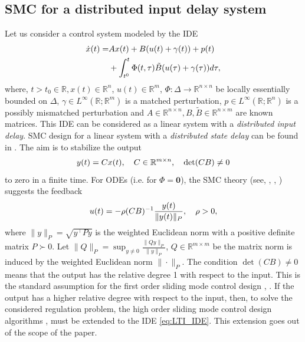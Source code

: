 \documentclass{article}
\newcommand{\R}{\mathbb{R}}
\newcommand{\zero}{\mathbf{0}}
\begin{document}
\subsection{SMC for a distributed  input delay system}
Let us consider a control system modeled by the IDE\vspace{-1mm}
\begin{equation}\label{eq:LTI_IDE}
	\begin{split}
		\dot x(t)=&Ax(t)+B(u(t)+\gamma(t))+p(t)\\
		&
		+\int^t_{t^0} \Phi(t,\tau) \tilde B (u(\tau)+\gamma(\tau))d
		\tau,
	\end{split}\vspace{-1mm}
\end{equation} 
where, $t>t_0\in \R, x(t)\in \R^n$, $u(t)\in \R^{m}$, $\Phi :\Delta\to \R^{n\times n}$ be locally essentially bounded on $\Delta$, $\gamma\in L^{\infty}(\R;\R^m)$ is a matched perturbation, $p\in L^{\infty}(\R;\R^n)$ is a possibly mismatched perturbation 
and $A\in \R^{n\times n}, B,\tilde B\in \R^{n\times m}$ are  known matrices. This IDE can be considered as a linear system with a  \textit{distributed input delay}. SMC design for a linear  system with a \textit{distributed state delay} can be found in \cite{Gouaisbaut_etal2001:TDS}. The aim is to stabilize the output \vspace{-1mm}
\begin{equation}\label{eq:LTI_y}
	y(t)=Cx(t), \quad C\in \R^{m\times n}, \quad \det (CB)\neq0\vspace{-1mm}
\end{equation}
to zero in a finite time. 
For  ODEs (i.e. for $\Phi=\zero$), the SMC theory (see, \cite{Utkin1992:Book}, \cite{EdwardsSpurgeon1998:Book}, \cite{Shtessel_etal2014:Book}) suggests  the  feedback\vspace{-1mm}
\begin{equation}\label{eq:SMC_LTI}
	u(t)=-\rho(CB)^{-1}\frac{y(t)}{\|y(t)\|_{P}}, \quad \rho >0,\vspace{-1mm}
\end{equation}
 where $\|y\|_{P}=\sqrt{y^{\top}Py}$ is the weighted Euclidean norm with a positive definite matrix $P\succ 0$. Let $\|Q\|_{P}=\sup_{y\neq 0} \frac{\|Qy\|_{P}}{\|y\|_{P}}$, $Q\in \R^{m\times m}$ be the matrix norm is induced by the weighted Euclidean norm $\|\cdot\|_{P}$.
 {The condition $\det(CB)\neq 0$ means that the output has the relative degree 1 with respect to the input. This is the standard  assumption for the first order sliding mode control design \cite{Utkin1992:Book}, \cite{Utkin_etal2020:Book}.
If the output has a higher relative degree with respect to the input, then, to solve the considered regulation problem, the high order sliding mode control design algorithms  \cite{Levant2003:IJC}, \cite{Shtessel_etal2014:Book} must be extended  to the IDE \eqref{eq:LTI_IDE}. This extension goes out of the scope of the paper.}
\end{document}
